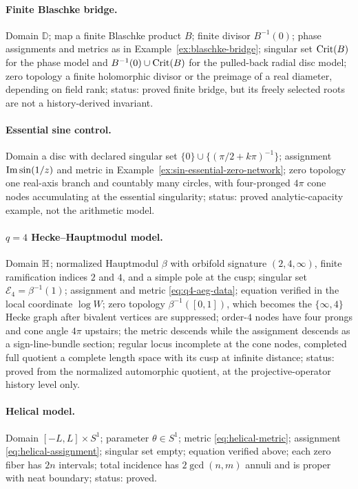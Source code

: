 \paragraph{Finite Blaschke bridge.}
Domain $\mathbb D$; map a finite Blaschke product $B$; finite divisor
$B^{-1}(0)$; phase assignments and metrics as in
Example~\ref{ex:blaschke-bridge}; singular set $\operatorname{Crit}(B)$ for the phase model and
$B^{-1}(0)\cup\operatorname{Crit}(B)$ for the pulled-back radial disc model; zero topology a
finite holomorphic divisor or the preimage of a real diameter, depending on field
rank; status: proved finite bridge, but its freely selected roots are not a
history-derived invariant.

\paragraph{Essential sine control.}
Domain a disc with declared singular set
$\{0\}\cup\{(\pi/2+k\pi)^{-1}\}$; assignment
$\operatorname{Im}\sin(1/z)$ and metric in Example~\ref{ex:sin-essential-zero-network}; zero
topology one real-axis branch and countably many circles, with four-pronged
$4\pi$ cone nodes accumulating at the essential singularity; status: proved
analytic-capacity example, not the arithmetic model.

\paragraph{$q=4$ Hecke--Hauptmodul model.}
Domain $\mathbb{H}$; normalized Hauptmodul $\beta$ with orbifold signature
$(2,4,\infty)$, finite ramification indices $2$ and $4$, and a simple pole at the
cusp; singular set $\mathcal E_4=\beta^{-1}(1)$; assignment and metric
\eqref{eq:q4-aeg-data}; equation verified in the local coordinate $\log W$;
zero topology $\beta^{-1}([0,1])$, which becomes the $\{\infty,4\}$ Hecke graph
after bivalent vertices are suppressed; order-$4$ nodes have four prongs and cone
angle $4\pi$ upstairs; the metric descends while the assignment descends as a
sign-line-bundle section; regular locus incomplete at the cone nodes, completed
full quotient a complete length space with its cusp at infinite distance; status:
proved from the normalized automorphic quotient, at the projective-operator history
level only.

\paragraph{Helical model.}
Domain $[-L,L]\times S^1$; parameter $\theta\in S^1$; metric
\eqref{eq:helical-metric}; assignment \eqref{eq:helical-assignment}; singular set
empty; equation verified above; each zero fiber has $2n$ intervals; total incidence
has $2\gcd(n,m)$ annuli and is proper with neat boundary; status: proved.

